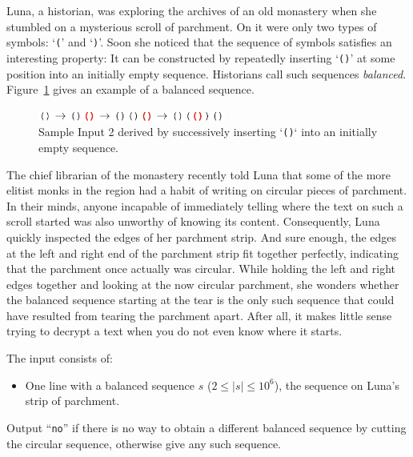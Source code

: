 \problemname{\problemyamlname}

\newcommand{\bracketprotagonist}{Luna}
%
\bracketprotagonist{}, a historian, was exploring the archives of an
old monastery when she stumbled on a mysterious scroll of parchment.
On it were only two types of symbols: `\texttt{(}' and `\texttt{)}'.
Soon she noticed that the sequence of symbols satisfies an interesting property:
It can be constructed by repeatedly inserting `\texttt{()}' at some
position into an initially empty sequence.
Historians call such sequences \emph{balanced}.
Figure~\ref{fig:bracket} gives an
example of a balanced sequence.

\begin{figure}[!h]
\centering
\includegraphics[width=0.55\textwidth]{bracket}
	\caption{Sample Input 2 derived by successively inserting
	`\texttt{()}` into an initially empty sequence.}
\label{fig:bracket}
\end{figure}

The chief librarian of the monastery recently told \bracketprotagonist{}
that some of the more elitist monks in the region had a habit of writing
on circular pieces of parchment.
In their minds, anyone
incapable of immediately telling where the text on such a scroll started was
also unworthy of knowing its content.
Consequently, \bracketprotagonist{} quickly inspected the edges of her
parchment strip. And sure enough, the edges at the left and right
end of the parchment strip fit together perfectly, indicating that the parchment
once actually was circular.
While holding the left and right edges together and looking at the now circular
parchment, she wonders whether the balanced sequence starting at the tear is the only
such sequence that could have resulted from tearing the parchment apart.
After all, it makes little sense trying to decrypt a text when you do not even
know where it starts.

\begin{Input}
	The input consists of:
	\begin{itemize}
		\item One line with a balanced sequence $s$ ($2\leq |s|\leq
			10^6$),
			the sequence on \bracketprotagonist{}'s strip of parchment.
	\end{itemize}
\end{Input}

\begin{Output}
	Output ``\texttt{no}'' if there is no way to obtain a different balanced
	sequence by cutting the circular sequence,
	otherwise give any such sequence.
\end{Output}
